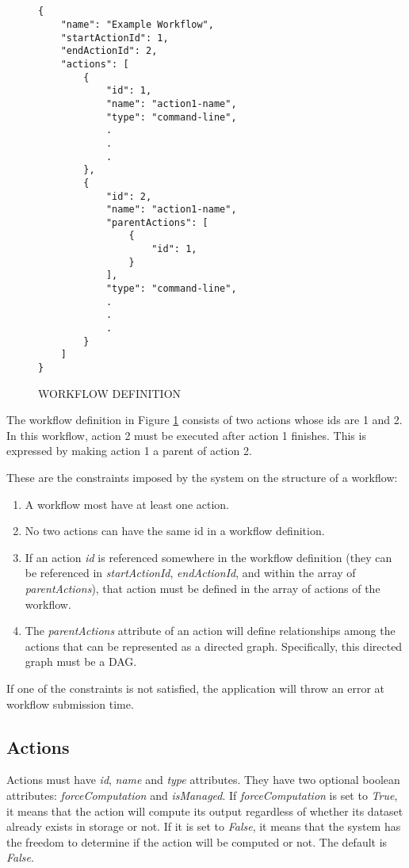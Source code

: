 \begin{figure}
\begin{mdframed}
\begin{singlespace}
\begin{verbatim}


{
    "name": "Example Workflow",
    "startActionId": 1,
    "endActionId": 2,
    "actions": [
        {
            "id": 1,
            "name": "action1-name",
            "type": "command-line",
            .
            .
            .
        },
        {
            "id": 2,
            "name": "action1-name",
            "parentActions": [
                { 
                    "id": 1,
                }
            ],
            "type": "command-line",
            .
            .
            .
        }
    ]
}
\end{verbatim}
\end{singlespace}
\end{mdframed}
\caption{WORKFLOW DEFINITION}
\label{fig:workflow_definition_language}
\end{figure}

The workflow definition in Figure \ref{fig:workflow_definition_language} consists of two actions whose ids are 1 and 2. In this workflow, action 2 must be executed after action 1 finishes. This is expressed by making action 1 a parent of action 2. 

These are the constraints imposed by the system on the structure of a workflow:
\begin{enumerate}
\item A workflow most have at least one action.
\item No two actions can have the same id in a workflow definition.
\item If an action \textit{id} is referenced somewhere in the workflow definition (they can be referenced in \textit{startActionId}, \textit{endActionId}, and within the array of \textit{parentActions}), that action must be defined in the array of actions of the workflow.
\item The \textit{parentActions} attribute of an action will define relationships among the actions that can be represented as a directed graph. Specifically, this directed graph must be a DAG.
\end{enumerate}

If one of the constraints is not satisfied, the application will throw an error at workflow submission time.

\subsection{Actions}
Actions must have \textit{id}, \textit{name} and \textit{type} attributes. They have two optional boolean attributes: \textit{forceComputation} and \textit{isManaged}. If \textit{forceComputation} is set to \textit{True}, it means that the action will compute its output regardless of whether its dataset already exists in storage or not. If it is set to \textit{False}, it means that the system has the freedom to determine if the action will be computed or not. The default is \textit{False}.

